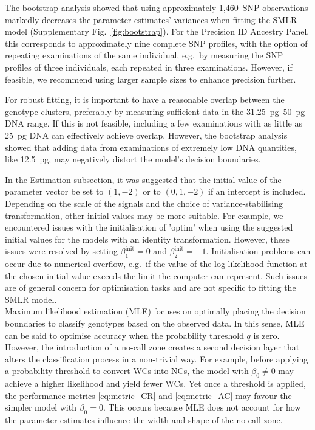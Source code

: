 \documentclass[preprint,5p,times,11pt]{elsarticle}
\begin{document}
The bootstrap analysis showed that using approximately 1,460~SNP observations markedly decreases the parameter estimates' variances when fitting the SMLR model (Supplementary Fig.~\ref{fig:bootstrap}).
For the Precision ID Ancestry Panel, this corresponds to approximately nine complete SNP profiles, with the option of repeating examinations of the same individual, e.g.~by measuring the SNP profiles of three individuals, each repeated in three examinations.
However, if feasible, we recommend using larger sample sizes to enhance precision further.

For robust fitting, it is important to have a reasonable overlap between the genotype clusters, preferably by measuring sufficient data in the \SIrange[range-units = single, range-phrase = --]{31.25}{50}{\pg} DNA range.
If this is not feasible, including a few examinations with as little as \SI{25}{\pg} DNA can effectively achieve overlap.
However, the bootstrap analysis showed that adding data from examinations of extremely low DNA quantities, like \SI{12.5}{\pg}, may negatively distort the model's decision boundaries.

In the Estimation subsection, it was suggested that the initial value of the parameter vector be set to $(1, -2)$ or to $(0, 1, -2)$ if an intercept is included.
Depending on the scale of the signals and the choice of variance-stabilising transformation, other initial values may be more suitable.
For example, we encountered issues with the initialisation of 'optim' when using the suggested initial values for the models with an identity transformation.
However, these issues were resolved by setting $\beta_1^{\text{init}} = 0$ and $\beta_2^{\text{init}} = -1$.
Initialisation problems can occur due to numerical overflow, e.g.~if the value of the log-likelihood function at the chosen initial value exceeds the limit the computer can represent.
Such issues are of general concern for optimisation tasks and are not specific to fitting the SMLR model.\\


Maximum likelihood estimation (MLE) focuses on optimally placing the decision boundaries to classify genotypes based on the observed data.
In this sense, MLE can be said to optimise accuracy when the probability threshold $q$ is zero.
However, the introduction of a no-call zone creates a second decision layer that alters the classification process in a non-trivial way.
For example, before applying a probability threshold to convert WCs into NCs, the model with $\beta_0 \neq 0$ may achieve a higher likelihood and yield fewer WCs.
Yet once a threshold is applied, the performance metrics \eqref{eq:metric_CR} and \eqref{eq:metric_AC} may favour the simpler model with $\beta_0 = 0$.
This occurs because MLE does not account for how the parameter estimates influence the width and shape of the no-call zone.
\end{document}
